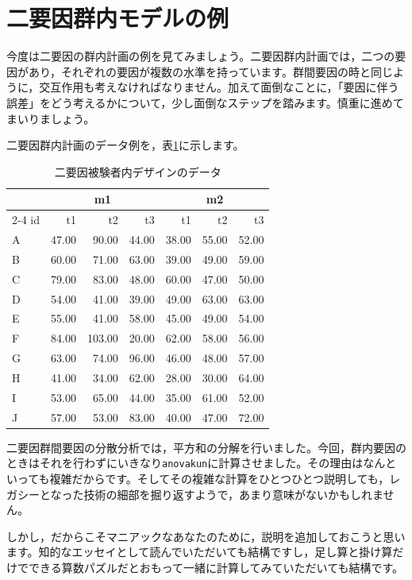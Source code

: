 \documentclass{ltjbook}
\begin{document}
\section{二要因群内モデルの例}
今度は二要因の群内計画の例を見てみましょう。二要因群内計画では，二つの要因があり，それぞれの要因が複数の水準を持っています。群間要因の時と同じように，交互作用も考えなければなりません。加えて面倒なことに，「要因に伴う誤差」をどう考えるかについて，少し面倒なステップを踏みます。慎重に進めてまいりましょう。

二要因群内計画のデータ例を，表\ref{tbl:21_05}に示します。

\begin{table}[ht]
\centering
\caption{二要因被験者内デザインのデータ}
\begin{tabular}{lrrrrrr}
  \hline
 & \multicolumn{3}{c}{m1} & \multicolumn{3}{c}{m2} \\
  \cline{2-4} \cline{5-7}
id & t1 & t2 & t3 & t1 & t2 & t3 \\
  \hline
A & 47.00 & 90.00 & 44.00 & 38.00 & 55.00 & 52.00 \\
  B & 60.00 & 71.00 & 63.00 & 39.00 & 49.00 & 59.00 \\
  C & 79.00 & 83.00 & 48.00 & 60.00 & 47.00 & 50.00 \\
  D & 54.00 & 41.00 & 39.00 & 49.00 & 63.00 & 63.00 \\
  E & 55.00 & 41.00 & 58.00 & 45.00 & 49.00 & 54.00 \\
  F & 84.00 & 103.00 & 20.00 & 62.00 & 58.00 & 56.00 \\
  G & 63.00 & 74.00 & 96.00 & 46.00 & 48.00 & 57.00 \\
  H & 41.00 & 34.00 & 62.00 & 28.00 & 30.00 & 64.00 \\
  I & 53.00 & 65.00 & 44.00 & 35.00 & 61.00 & 52.00 \\
  J & 57.00 & 53.00 & 83.00 & 40.00 & 47.00 & 72.00 \\
   \hline
\end{tabular}
\label{tbl:21_05}
\end{table}

二要因群間要因の分散分析では，平方和の分解を行いました。今回，群内要因のときはそれを行わずにいきなり\verb|anovakun|に計算させました。その理由はなんといっても複雑だからです。そしてその複雑な計算をひとつひとつ説明しても，レガシーとなった技術の細部を掘り返すようで，あまり意味がないかもしれません。

しかし，だからこそマニアックなあなたのために，説明を追加しておこうと思います。知的なエッセイとして読んでいただいても結構ですし，足し算と掛け算だけでできる算数パズルだとおもって一緒に計算してみていただいても結構です。
\end{document}
